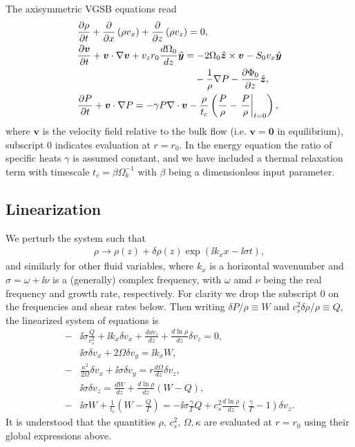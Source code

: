 The axisymmetric VGSB equations read 
\begin{align}
  & \frac{\p\rho}{\p t} + \frac{\p}{\p x}\left(\rho v_x\right) +
  \frac{\p}{\p z}\left(\rho v_z\right)=0,\\
  & \frac{\p\bm{v}}{\p t} + \bm{v}\cdot\nabla\bm{v} +
  v_zr_0\frac{d\Omega_0}{dz} \hat{\bm{y}} = - 
  2\Omega_0\hat{\bm{z}}\times\bm{v} - S_0v_x\hat{\bm{y}} \notag\\ 
  &\phantom{\frac{\p\bm{v}}{\p t} + \bm{v}\cdot\nabla\bm{v} +
    v_zr_0\frac{d\Omega_0}{dz} \hat{\bm{y}}=}-\frac{1}{\rho}\nabla P - \frac{\p\Phi_0}{\p z}\hat{\bm{z}},\\
  & \frac{\p P}{\p t} + \bm{v}\cdot\nabla P = -\gamma P
  \nabla\cdot\bm{v} -
  \frac{\rho}{t_c}\left(\frac{P}{\rho}-\left.\frac{P}{\rho}\right|_{t=0}\right), 
\end{align}
where $\bm{v}$ is the velocity field relative to the bulk flow
(i.e. $\bm{v}=\bm{0}$ in equilibrium),  
subscript $0$ indicates evaluation at $r=r_0$. In the energy equation
the ratio of specific heats $\gamma$ is assumed constant, 
and we have included a thermal relaxation term with timescale
$t_c=\beta\Omega_k^{-1}$ with $\beta$  being a dimensionless input
parameter.    

\subsection{Linearization}
We perturb the system such that
\begin{align}
  \rho \to \rho(z) + \delta\rho(z)\exp{\left(\ii k_x x - \ii\sigma
      t\right)},    
\end{align}
and similarly for other fluid variables, where $k_x$ is a horizontal
wavenumber and $\sigma = \omega + \ii \nu$ is a (generally) complex
frequency, with $\omega$ amd $\nu$ being the real frequency and growth
rate, respectively. For clarity we drop the subscript $0$ on the
frequencies and shear rates below. Then writing $\delta P /\rho \equiv W$
and $c_s^2\delta\rho/\rho\equiv Q$, the linearized system of equations
is   
 \begin{align}
   -&\ii\sigma \frac{Q}{c_s^2} + \ii k_x \delta v_x + \frac{d\dd
     v_z}{dz} + \frac{d\ln{\rho}}{dz}\delta v_z = 0,\label{lin_mass}\\
   &\ii\sigma \delta v_x + 2\Omega\delta v_y = \ii k_x W,\label{lin_vx}\\
   -&\frac{\kappa^2}{2\Omega}\delta v_x + \ii \sigma\delta v_y =
   r\frac{d\Omega}{dz}\delta v_z, \label{lin_vy}\\
   & \ii\sigma\delta v_z = \frac{dW}{dz} +
   \frac{d\ln{\rho}}{dz}\left(W-Q\right), \label{lin_vz}\\
   -&\ii\sigma W + \frac{1}{t_c}\left(W-\frac{Q}{\Gamma}\right) = -\ii\sigma\frac{\gamma}{\Gamma} Q +
   c_s^2\frac{d\ln{\rho}}{dz}\left(\frac{\gamma}{\Gamma}-1\right)\delta v_z.\label{lin_energy}
 \end{align}
It is understood that the quantities $\rho,\,c_s^2,\,\Omega,\kappa$
are evaluated at $r=r_0$ using their global expressions above.  

